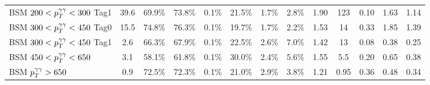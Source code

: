 \begin{tabular}{l|cccccccc|c|ccc}
     BSM $200<p_T^{\gamma\gamma}<300$ Tag1 & 39.6 & 69.9\% & 73.8\% & 0.1\% & 21.5\% & 1.7\% & 2.8\% & 1.90 & 123 & 0.10 & 1.63 & 1.14 \\
     [\cmsTabSkip]
     BSM $300<p_T^{\gamma\gamma}<450$ Tag0 & 15.5 & 74.8\% & 76.3\% & 0.1\% & 19.7\% & 1.7\% & 2.2\% & 1.53 & 14 & 0.33 & 1.85 & 1.39 \\
     BSM $300<p_T^{\gamma\gamma}<450$ Tag1 & 2.6 & 66.3\% & 67.9\% & 0.1\% & 22.5\% & 2.6\% & 7.0\% & 1.42 & 13 & 0.08 & 0.38 & 0.25 \\
     [\cmsTabSkip]
     BSM $450<p_T^{\gamma\gamma}<650$ & 3.1 & 58.1\% & 61.8\% & 0.1\% & 30.0\% & 2.4\% & 5.6\% & 1.55 & 5.5 & 0.20 & 0.65 & 0.38 \\
     [\cmsTabSkip]
     BSM $p_T^{\gamma\gamma}>650$ & 0.9 & 72.5\% & 72.3\% & 0.1\% & 21.0\% & 2.9\% & 3.8\% & 1.21 & 0.95 & 0.36 & 0.48 & 0.34 \\
     \hline
\end{tabular}
